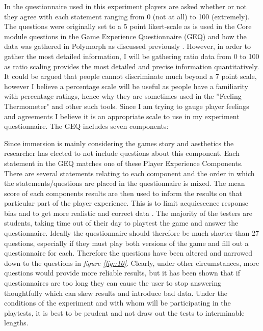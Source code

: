 \documentclass[journal]{IEEEtran}
\begin{document}
In the questionnaire used in this experiment players are asked whether or not they agree with each statement ranging from 0 (not at all) to 100 (extremely). The questions were originally set to a 5 point likert-scale as is used in the Core module questions in the Game Experience Questionnaire (GEQ) \cite{ijsselsteijn2013game} and how the data was gathered in Polymorph as discussed previously \cite{jennings2010polymorph}. However, in order to gather the most detailed information, I will be gathering ratio data from 0 to 100 as ratio scaling provides the most detailed and precise information quantitatively. It could be argued that people cannot discriminate much beyond a 7 point scale, however I believe a percentage scale will be useful as people have a familiarity with percentage ratings, hence why they are sometimes used in the ''Feeling Thermometer" and other such tools. Since I am trying to gauge player feelings and agreements I believe it is an appropriate scale to use in my experiment questionnaire. The GEQ includes seven components: 


Since immersion is mainly considering the games story and aesthetics the researcher has elected to not include questions about this component.
Each statement in the GEQ matches one of these Player Experience Components. There are several statements relating to each component and the order in which the statements/questions are placed in the questionnaire is mixed. The mean score of each components results are then used to inform the results on that particular part of the player experience. This is to limit acquiescence response bias and to get more realistic and correct data \cite{winkler1982controlling}. 
The majority of the testers are students, taking time out of their day to playtest the game and answer the questionnaire. Ideally the questionnaire should therefore be much shorter than 27 questions, especially if they must play both versions of the game and fill out a questionnaire for each. Therefore the questions have been altered and narrowed down to the questions in \textit{figure \ref{fig::10}}. Clearly, under other circumstances, more questions would provide more reliable results, but it has been shown that if questionnaires are too long they can cause the user to stop answering thoughtfully which can skew results and introduce bad data. Under the conditions of the experiment and with whom will be participating in the playtests, it is best to be prudent and not draw out the tests to interminable lengths.
\end{document}
